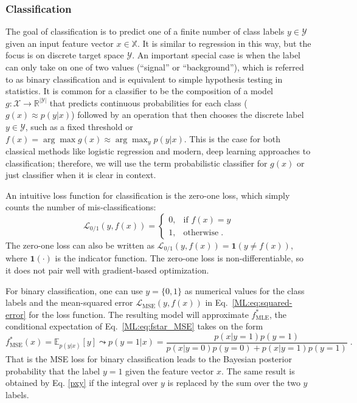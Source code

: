 \subsubsection{Classification}\label{ML:sec:classification}

The goal of classification is to predict one of a finite number of class labels $y\in \mathcal{Y}$ given an input feature vector $x \in \mathbb{X}$. It is similar to regression in this way, but the focus is on discrete target space $\mathcal{Y}$. An important special case is when the label can only take on one of two values (\eg ``signal'' or ``background''), which is referred to as binary classification and is equivalent to simple hypothesis testing in statistics. It is common for a classifier to be the composition of a model $g:\mathcal{X} \to \mathbb{R}^{|\mathcal{Y}|}$ that predicts continuous probabilities for each class (\ie $g(x) \approx p(y|x)$) followed by an operation that then chooses the discrete label $y\in\mathcal{Y}$, such as a fixed threshold or $f(x) = \arg \max g(x) \approx \arg \max_y p(y|x)$. This is the case for both classical methods like logistic regression and modern, deep learning approaches to classification; therefore, we will use the term probabilistic classifier for $g(x)$ or just classifier when it is clear in context.

An intuitive loss function for classification is the zero-one loss, which simply counts the number of mis-classifications:
\begin{equation}
    \label{ML:eq:zero-one}
       \mathcal{L}_\textrm{0/1}(y, f(x))= 
\begin{cases}
    0 ,& \text{if } f(x) = y\\
    1,              & \text{otherwise} \; .
\end{cases}
\end{equation}
The zero-one loss can also be written as $\mathcal{L}_\textrm{0/1}(y, f(x)) = \mathbf{1}(y \ne f(x))$, where $\mathbf{1}(\cdot)$ is the indicator function. The zero-one loss is non-differentiable, so it does not pair well with gradient-based optimization. 

For binary classification, one can use $y=\{0,1\}$ as numerical values for the class labels and the mean-squared error $\mathcal{L}_\textrm{MSE}(y, f(x))$ in Eq.~\ref{ML:eq:squared-error} for the loss function. The resulting model will approximate $f^*_\textrm{MLE}$, the conditional expectation of Eq.~\ref{ML:eq:fstar_MSE} takes on the form 
\begin{equation}
    \label{ML:eq:fstar_MSE_binary}
    f^*_\textrm{MSE}(x) = \mathbb{E}_{p(y|x)} [y]  \leadsto p(y=1|x) = \frac{p(x|y=1)p(y=1)}{p(x|y=0)p(y=0)+p(x|y=1)p(y=1)} \;.
\end{equation}
That is the MSE loss for binary classification leads to the Bayesian posterior probability that the label $y=1$ given the feature vector $x$. The same 
result is obtained 
by Eq. 
\ref{pxy} if the integral over $y$ is 
replaced by the sum over the two $y$ labels. 

